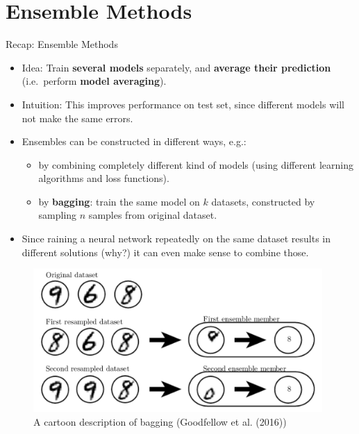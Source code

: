 \section{Ensemble Methods}
\begin{vbframe}{Recap: Ensemble Methods}

\begin{itemize}
\item Idea: Train \textbf{several models} separately, and \textbf{average their prediction} (i.e.~perform \textbf{model averaging}).
\item Intuition: This improves performance on test set, since different models will not make the same errors.
\item Ensembles can be constructed in different ways, e.g.:
\begin{itemize}
\item by combining completely different kind of models (using different learning algorithms and loss functions).
\item by \textbf{bagging}: train the same model on $k$ datasets, constructed by sampling $n$ samples from original dataset.
\end{itemize}
\item Since  raining a neural network repeatedly on the same dataset results in different solutions (why?) it can even make sense to combine those.
\end{itemize}

\framebreak 

\begin{figure}
    \centering
      \includegraphics[width=11cm]{figure/bagging.png}
      \caption{ A cartoon description of bagging (Goodfellow et al. (2016))}
  \end{figure}

\end{vbframe}
